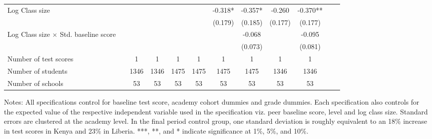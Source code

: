 \begin{center}
\begin{scriptsize}
\begin{threeparttable}
\begin{tabular} {@{} l l c c c c c c c c c c  @{}}
Log Class size &  &  &  &  &  & -0.318* & -0.357* & -0.260 & -0.370** \\
                 &  &  &  &  &  & (0.179) & (0.185) & (0.177) & (0.177) \\
Log Class size $\times$ Std. baseline score &  &  &  &  &  &  & -0.068 &  & -0.095 \\
                 &  &  &  &  &  &  & (0.073) &  & (0.081) \\
\midrule
Number of test scores &  & 1 & 1 & 1 & 1 & 1 & 1 & 1 & 1 \\
Number of students &  & 1346 & 1346 & 1475 & 1475 & 1475 & 1475 & 1346 & 1346 \\
Number of schools &  & 53 & 53 & 53 & 53 & 53 & 53 & 53 & 53 \\
\bottomrule
\end{tabular}
\begin{tablenotes}
\item Notes: All specifications control for baseline test score, academy cohort dummies and grade dummies. Each specification also controls for the expected value of the respective independent variable used in the specification viz. peer baseline score, level and log class size. Standard errors are clustered at the academy level. In the final period control group, one standard deviation is roughly equivalent to an 18\% increase in test scores in Kenya and 23\% in Liberia. ***, **, and * indicate significance at 1\%, 5\%, and 10\%.\end{tablenotes}
\end{threeparttable}
\end{scriptsize}
\end{center}
\clearpage
